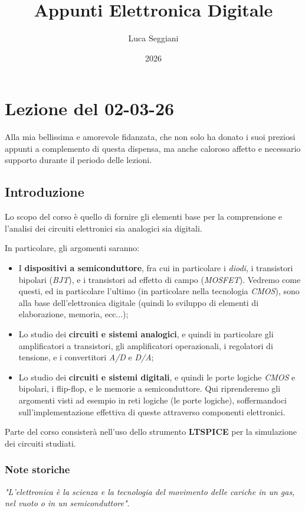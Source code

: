 \documentclass[a4paper,11pt]{article}
\title{Appunti Elettronica Digitale}
\author{Luca Seggiani}
\date{2026}
\begin{document}
\section{Lezione del 02-03-26}

\thispagestyle{empty}
\pagestyle{fancy}

\small
Alla mia bellissima e amorevole fidanzata, che non solo ha donato i suoi preziosi appunti a complemento di questa dispensa, ma anche caloroso affetto e necessario supporto durante il periodo delle lezioni.


\normalsize
\subsection{Introduzione}
Lo scopo del corso è quello di fornire gli elementi base per la comprensione e l'analisi dei circuiti elettronici sia analogici sia digitali.

In particolare, gli argomenti saranno:
\begin{itemize}
	\item I \textbf{dispositivi a semiconduttore}, fra cui in particolare i \textit{diodi}, i transistori bipolari (\textit{BJT}), e i transistori ad effetto di campo (\textit{MOSFET}). 
		Vedremo come questi, ed in particolare l'ultimo (in particolare nella tecnologia \textit{CMOS}), sono alla base dell'elettronica digitale (quindi lo sviluppo di elementi di elaborazione, memoria, ecc...);
	\item Lo studio dei \textbf{circuiti e sistemi analogici}, e quindi in particolare gli amplificatori a transistori, gli amplificatori operazionali, i regolatori di tensione, e i convertitori \textit{A/D} e \textit{D/A}; 
	\item Lo studio dei \textbf{circuiti e sistemi digitali}, e quindi le porte logiche \textit{CMOS} e bipolari, i flip-flop, e le memorie a semiconduttore. Qui riprenderemo gli argomenti visti ad esempio in reti logiche (le porte logiche), soffermandoci sull'implementazione effettiva di queste attraverso componenti elettronici.	
\end{itemize}

Parte del corso consisterà nell'uso dello strumento \textbf{LTSPICE} per la simulazione dei circuiti studiati.

\subsubsection{Note storiche}
\textit{"L'elettronica è la scienza e la tecnologia del movimento delle cariche in un gas, nel vuoto o in un semiconduttore"}.
\end{document}
